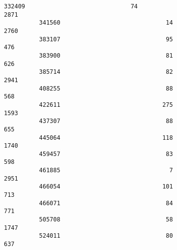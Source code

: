 \documentclass[11pt]{article}
\begin{document}
\begin{Verbatim}[commandchars=\\\{\}]
          332409                              74                             2871   
          341560                              14                             2760   
          383107                              95                              476   
          383900                              81                              626   
          385714                              82                             2941   
          408255                              88                              568   
          422611                             275                             1593   
          437307                              88                              655   
          445064                             118                             1740   
          459457                              83                              598   
          461885                               7                             2951   
          466054                             101                              713   
          466071                              84                              771   
          505708                              58                             1747   
          524011                              80                              637   
          

\end{Verbatim}
\end{document}

